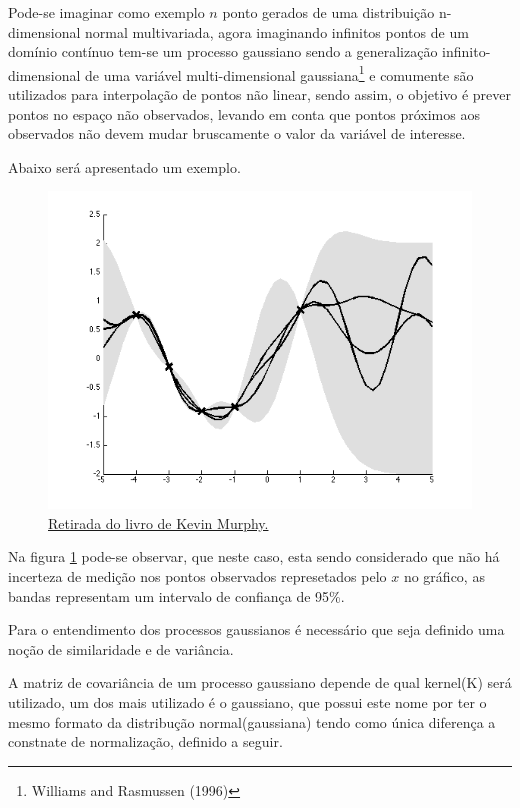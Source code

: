 \documentclass[
	12pt,				%
	a4paper,		%
	oneside,    %
	chapter=TITLE,		   %
	section=TITLE,		   %
	subsection=TITLE,	   %
	subsubsection=TITLE, %
	english,			%
	french,				%
	spanish,			%
	brazil,				%
]{abntex2}
\begin{document}
Pode-se imaginar como exemplo \(n\) ponto gerados de uma distribuição
n-dimensional normal multivariada, agora imaginando infinitos pontos de
um domínio contínuo tem-se um processo gaussiano sendo a generalização
infinito-dimensional de uma variável multi-dimensional
gaussiana\footnote{Williams and Rasmussen (1996)} e comumente são
utilizados para interpolação de pontos não linear, sendo assim, o
objetivo é prever pontos no espaço não observados, levando em conta que
pontos próximos aos observados não devem mudar bruscamente o valor da
variável de interesse.

Abaixo será apresentado um exemplo.

\begin{figure}
\centering
\includegraphics[width=\textwidth,height=0.3\textheight]{fig/gp.png}
\caption{\href{https://github.com/probml/pmtk3/blob/30d7a1952f3979b16e92dbfa4cd1ce0e402cf7d8/docs/demoOutput/bookDemos/(15)-Gaussian_processes/gprDemoNoiseFree_02.png}{Retirada
do livro de Kevin Murphy.\label{gp}}}
\end{figure}

Na figura \ref{gp} pode-se observar, que neste caso, esta sendo
considerado que não há incerteza de medição nos pontos observados
represetados pelo \(x\) no gráfico, as bandas representam um intervalo
de confiança de 95\%.

Para o entendimento dos processos gaussianos é necessário que seja
definido uma noção de similaridade e de variância.

A matriz de covariância de um processo gaussiano depende de qual
kernel(K) será utilizado, um dos mais utilizado é o gaussiano, que
possui este nome por ter o mesmo formato da distribução
normal(gaussiana) tendo como única diferença a constnate de
normalização, definido a seguir.
\end{document}
